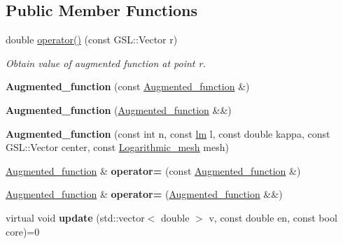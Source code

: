 \subsection*{Public Member Functions}
\begin{DoxyCompactItemize}
\item 
\mbox{\label{classAugmented__function_ae9be3ac88a8aaffed7deea457a0650f5}} 
double \hyperlink{classAugmented__function_ae9be3ac88a8aaffed7deea457a0650f5}{operator()} (const G\+S\+L\+::\+Vector r)
\begin{DoxyCompactList}\small\item\em Obtain value of augmented function at point r. \end{DoxyCompactList}\item 
\mbox{\label{classAugmented__function_aaef792b83ff2c7a59cbdbf1b40ff08a7}} 
{\bfseries Augmented\+\_\+function} (const \hyperlink{classAugmented__function}{Augmented\+\_\+function} \&)
\item 
\mbox{\label{classAugmented__function_a782da1c8f31a70fd897cc8c00bbc0c44}} 
{\bfseries Augmented\+\_\+function} (\hyperlink{classAugmented__function}{Augmented\+\_\+function} \&\&)
\item 
\mbox{\label{classAugmented__function_af6f0be4a0f6b78def8f923c8a7daea18}} 
{\bfseries Augmented\+\_\+function} (const int n, const \hyperlink{structlm}{lm} l, const double kappa, const G\+S\+L\+::\+Vector center, const \hyperlink{classLogarithmic__mesh}{Logarithmic\+\_\+mesh} mesh)
\item 
\mbox{\label{classAugmented__function_aa00aea37783023653cd9880277b51278}} 
\hyperlink{classAugmented__function}{Augmented\+\_\+function} \& {\bfseries operator=} (const \hyperlink{classAugmented__function}{Augmented\+\_\+function} \&)
\item 
\mbox{\label{classAugmented__function_ad1c67ee06b3e97cb031e69329f94f300}} 
\hyperlink{classAugmented__function}{Augmented\+\_\+function} \& {\bfseries operator=} (\hyperlink{classAugmented__function}{Augmented\+\_\+function} \&\&)
\item 
\mbox{\label{classAugmented__function_a087c956ca3c8cc160ceacaa51e054ee8}} 
virtual void {\bfseries update} (std\+::vector$<$ double $>$ v, const double en, const bool core)=0
\end{DoxyCompactItemize}
